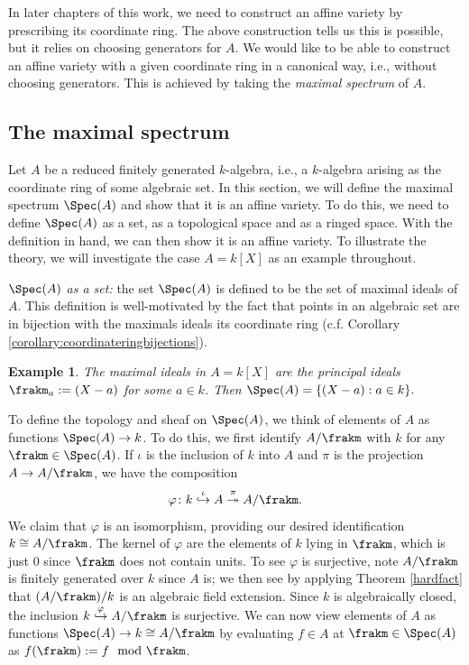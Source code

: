 \documentclass[12pt]{amsart}
\theoremstyle{plain}
\newtheorem{example}[theorem]{Example}
\begin{document}
In later chapters of this work, we need to construct an affine variety by prescribing its coordinate ring.
The above construction tells us this is possible, but it relies on choosing generators for $A$.
We would like to be able to construct an affine variety with a given coordinate ring in a canonical way, i.e., without choosing generators.
This is achieved by taking the \emph{maximal spectrum} of $A$.

\subsection{The maximal spectrum}
Let $A$ be a reduced finitely generated $k$-algebra, i.e., a $k$-algebra arising as the coordinate ring of some algebraic set.
In this section, we will define the maximal spectrum $\Spec(A)$ and show that it is an affine variety.
To do this, we need to define $\Spec(A)$ as a set, as a topological space and as a ringed space.
With the definition in hand, we can then show it is an affine variety.
To illustrate the theory, we will investigate the case $A=k[X]$ as an example throughout.

\emph{$\Spec(A)$ as a set:}
the set $\Spec(A)$ is defined to be the set of maximal ideals of $A$.
This definition is well-motivated by the fact that points in an algebraic set are in bijection with the maximals ideals its coordinate ring (c.f. Corollary \ref{corollary:coordinateringbijections}).

\begin{example}
The maximal ideals in $A=k[X]$ are the principal ideals $\frakm_a:=(X-a)$ for some $a\in k$.
Then $\Spec(A) = \{(X-a) : a \in k\}.$
\end{example}

To define the topology and sheaf on $\Spec(A)$, we think of elements of $A$ as functions $\Spec(A) \to k$.
To do this, we first identify $A/\frakm$ with $k$ for any $\frakm \in \Spec(A)$.
If $\iota$ is the inclusion of $k$ into $A$ and $\pi$ is the projection $A \to A/\frakm$, we have the composition
$$\varphi \colon k \overset{\iota}{\hookrightarrow} A \overset{\pi}{\twoheadrightarrow} A/\frakm.$$
We claim that $\varphi$ is an isomorphism, providing our desired identification $k \cong A/\frakm$.
The kernel of $\varphi$ are the elements of $k$ lying in $\frakm$, which is just $0$ since $\frakm$ does not contain units.
To see $\varphi$ is surjective, note $A/\frakm$ is finitely generated over $k$ since $A$ is;
we then see by applying Theorem \ref{hardfact} that $(A/\frakm)/k$ is an algebraic field extension.
Since $k$ is algebraically closed, the inclusion $k \overset{\varphi}{\hookrightarrow} A/\frakm$ is surjective.
We can now view elements of $A$ as functions $\Spec(A) \to k \cong A/\frakm$ by evaluating $f\in A$ at $\frakm\in\Spec(A)$ as $f(\frakm):=f \mod \frakm$.
\end{document}
